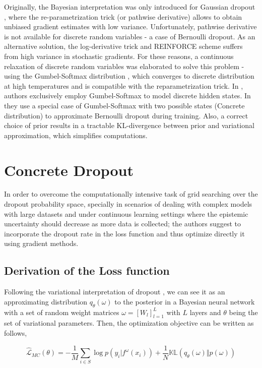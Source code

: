\documentclass{article}
\begin{document}
Originally, the Bayesian interpretation was only introduced for Gaussian dropout \cite{welling}, where the re-parametrization trick (or pathwise derivative) allows to obtain unbiased gradient estimates with low variance. Unfortunately, pathwise derivative is not available for discrete random variables - a case of Bernoulli dropout. As an alternative solution, the log-derivative trick and REINFORCE scheme \cite{Williams1992} suffers from high variance in stochastic gradients. For these reasons, a continuous relaxation of discrete random variables was elaborated to solve this problem - using the Gumbel-Softmax distribution \cite{gumbel}, which converges to discrete distribution at high temperatures and is compatible with the reparametrization trick. In \cite{gumbel}, authors exclusively employ Gumbel-Softmax to model discrete hidden states. In \cite{concrete} they use a special case of Gumbel-Softmax with two possible states (Concrete distribution) to approximate Bernoulli dropout during training. Also, a correct choice of prior results in a tractable KL-divergence between prior and variational approximation, which simplifies computations.

\section{Concrete Dropout}
\label{sec:headings}
In order to overcome the computationally intensive task of grid searching over the dropout probability space, specially in scenarios of dealing with complex models with large datasets and under continuous learning settings where the epistemic uncertainty should decrease as more data is collected; the authors suggest to incorporate the dropout rate in the loss function and thus optimize directly it using gradient methods. \\

\subsection{Derivation of the Loss function}
Following the variational interpretation of dropout \cite{Gal2016Uncertainty}, we can see it as an approximating distribution $q_\theta(\omega)$ to the posterior in a Bayesian neural network with a set of random weight matrices $ \omega = \left[ W_l \right]_{l=1}^L$  with $L$ layers and $\theta$ being the set of variational parameters. Then, the optimization objective can be written as follows, 

\begin{equation}\label{eq1}
    \hat{\mathcal{L}}_{MC} (\theta) = -\frac{1}{M} \sum_{i\in S} \log p\left( y_i\vert f^{\omega} ( x_i ) \right) + \frac{1}{N} \mathbb{KL} \left( q_\theta(\omega) \Vert p(\omega) \right)
\end{equation}
\end{document}
